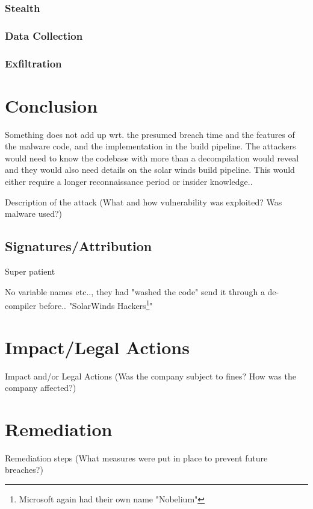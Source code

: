 \documentclass[
	letterpaper, %
	10pt, %
	unnumberedsections, %
	twoside, %
]{LTJournalArticle}
\begin{document}
\subsubsection{Stealth}

\subsubsection{Data Collection}

\subsubsection{Exfiltration}

\section{Conclusion}
Something does not add up wrt. the presumed breach time and the features of the malware code, and the implementation in the build pipeline. The attackers would need to know the codebase with more than a decompilation would reveal and they would also need details on the solar winds build pipeline. This would either require a longer reconnaissance period or insider knowledge..  


Description of the attack (What and how vulnerability was exploited? Was malware used?)


\subsection{Signatures/Attribution}

Super patient

No variable names etc.., they had "washed the code" send it through a de-compiler before..
"SolarWinds Hackers\footnote{Microsoft again had their own name "Nobelium"}"


\section{Impact/Legal Actions} 
Impact and/or Legal Actions (Was the company subject to fines? How was the company affected?)

\section{Remediation} 
Remediation steps (What measures were put in place to prevent future breaches?)
\end{document}
